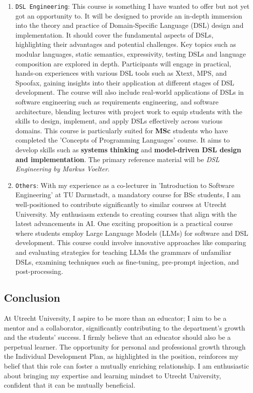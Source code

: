 \documentclass[12pt,a4paper,sans]{moderncv}
\begin{document}
\begin{enumerate}
    \item \texttt{DSL Engineering}: This course is something I have wanted to offer but not yet got an opportunity to. It will be designed to provide an in-depth immersion into the theory and practice of Domain-Specific Language (DSL) design and implementation. It should cover the fundamental aspects of DSLs, highlighting their advantages and potential challenges. Key topics such as modular languages, static semantics, expressivity, testing DSLs and language composition are explored in depth. Participants will engage in practical, hands-on experiences with various DSL tools such as Xtext, MPS, and Spoofax, gaining insights into their application at different stages of DSL development. The course will also include real-world applications of DSLs in software engineering such as requirements engineering, and software architecture, blending lectures with project work to equip students with the skills to design, implement, and apply DSLs effectively across various domains. This course is particularly suited for \textbf{MSc} students who have completed the 'Concepts of Programming Languages' course. It aims to develop skills such as \textbf{systems thinking} and \textbf{model-driven DSL design and implementation}. The primary reference material will be \textit{DSL Engineering by Markus Voelter}.
    \item \texttt{Others}: With my experience as a co-lecturer in 'Introduction to Software Engineering' at TU Darmstadt, a mandatory course for BSc students, I am well-positioned to contribute significantly to similar courses at Utrecht University. My enthusiasm extends to creating courses that align with the latest advancements in AI. One exciting proposition is a practical course where students employ Large Language Models (LLMs) for software and DSL development. This course could involve innovative approaches like comparing and evaluating strategies for teaching LLMs the grammars of unfamiliar DSLs, examining techniques such as fine-tuning, pre-prompt injection, and post-processing. 
\end{enumerate}

\subsection*{Conclusion}

At Utrecht University, I aspire to be more than an educator; I aim to be a mentor and a collaborator, significantly contributing to the department's growth and the students' success. I firmly believe that an educator should also be a perpetual learner. The opportunity for personal and professional growth through the Individual Development Plan, as highlighted in the position, reinforces my belief that this role can foster a mutually enriching relationship. I am enthusiastic about bringing my expertise and learning mindset to Utrecht University, confident that it can be mutually beneficial.
\end{document}
